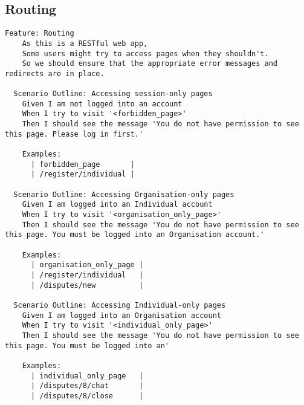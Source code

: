 \subsection{Routing}

\begin{lstlisting}
Feature: Routing
    As this is a RESTful web app,
    Some users might try to access pages when they shouldn't.
    So we should ensure that the appropriate error messages and redirects are in place.

  Scenario Outline: Accessing session-only pages
    Given I am not logged into an account
    When I try to visit '<forbidden_page>'
    Then I should see the message 'You do not have permission to see this page. Please log in first.'

    Examples:
      | forbidden_page       |
      | /register/individual |

  Scenario Outline: Accessing Organisation-only pages
    Given I am logged into an Individual account
    When I try to visit '<organisation_only_page>'
    Then I should see the message 'You do not have permission to see this page. You must be logged into an Organisation account.'

    Examples:
      | organisation_only_page |
      | /register/individual   |
      | /disputes/new          |

  Scenario Outline: Accessing Individual-only pages
    Given I am logged into an Organisation account
    When I try to visit '<individual_only_page>'
    Then I should see the message 'You do not have permission to see this page. You must be logged into an'

    Examples:
      | individual_only_page   |
      | /disputes/8/chat       |
      | /disputes/8/close      |

\end{lstlisting}